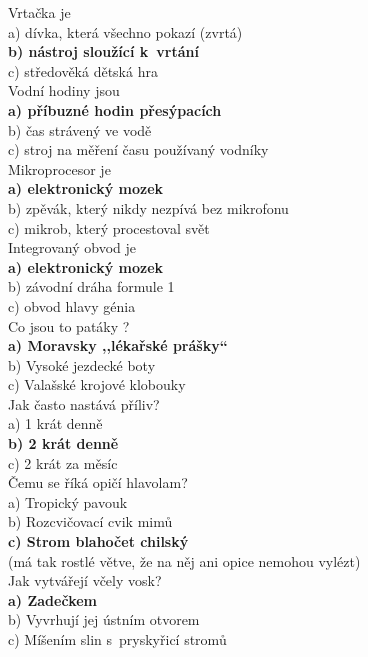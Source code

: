 \begin{multicols}{\value{columnsthindata}}
\noindent
Vrtačka je\\
a) dívka, která všechno pokazí (zvrtá)\\
\textbf{b) nástroj sloužící k~vrtání}\\
c) středověká dětská hra\\

\noindent
Vodní hodiny jsou\\
\textbf{a) příbuzné hodin přesýpacích}\\
b) čas strávený ve vodě\\
c) stroj na měření času používaný vodníky\\

\noindent
Mikroprocesor je\\
\textbf{a) elektronický mozek}\\
b) zpěvák, který nikdy nezpívá bez mikrofonu\\
c) mikrob, který procestoval svět\\

\noindent
Integrovaný obvod je\\
\textbf{a) elektronický mozek}\\
b) závodní dráha formule 1\\
c) obvod hlavy génia\\

\noindent
Co jsou to patáky ?\\
\textbf{a) Moravsky ,,lékařské prášky``}\\
b) Vysoké jezdecké boty\\
c) Valašské krojové klobouky\\

\noindent
Jak často nastává příliv?\\
a) 1 krát denně\\
\textbf{b) 2 krát denně}\\
c) 2 krát za měsíc\\

\noindent
Čemu se říká opičí hlavolam?\\
a) Tropický pavouk\\
b) Rozcvičovací cvik mimů\\
\textbf{c) Strom blahočet chilský}\\
(má tak rostlé větve, že na něj ani opice nemohou vylézt)\\

\noindent
Jak vytvářejí včely vosk?\\
\textbf{a) Zadečkem}\\
b) Vyvrhují jej ústním otvorem\\
c) Míšením slin s~pryskyřicí stromů\\


\end{multicols}

